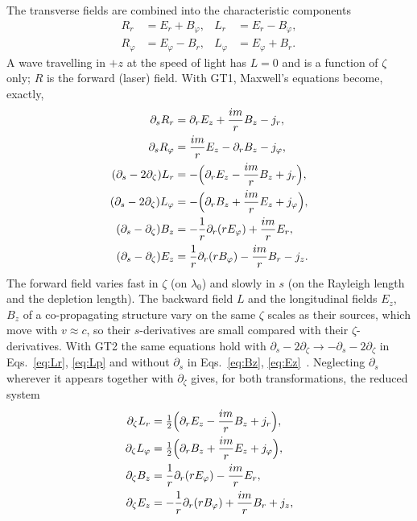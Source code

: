 \documentclass[aps,prab,reprint,floatfix,superscriptaddress,amsmath,amssymb]{revtex4-2}
\begin{document}
The transverse fields are combined into the characteristic components
\begin{align}
R_r &= E_r + B_\varphi, & L_r &= E_r - B_\varphi, \nonumber\\
R_\varphi &= E_\varphi - B_r, & L_\varphi &= E_\varphi + B_r .
\end{align}
A wave travelling in $+z$ at the speed of light has $L = 0$ and is a function of $\zeta$ only; $R$ is the forward (laser) field. With GT1, Maxwell's equations become, exactly,
\begin{align}
\partial_s R_r &= \partial_r E_z + \frac{im}{r} B_z - j_r, \label{eq:Rr}\\
\partial_s R_\varphi &= \frac{im}{r} E_z - \partial_r B_z - j_\varphi, \label{eq:Rp}\\
(\partial_s - 2\partial_\zeta) L_r &= -\Bigl(\partial_r E_z - \frac{im}{r}B_z + j_r\Bigr), \label{eq:Lr}\\
(\partial_s - 2\partial_\zeta) L_\varphi &= -\Bigl(\partial_r B_z + \frac{im}{r}E_z + j_\varphi\Bigr), \label{eq:Lp}\\
(\partial_s - \partial_\zeta) B_z &= -\frac{1}{r}\partial_r (r E_\varphi) + \frac{im}{r} E_r, \label{eq:Bz}\\
(\partial_s - \partial_\zeta) E_z &= \frac{1}{r}\partial_r (r B_\varphi) - \frac{im}{r} B_r - j_z . \label{eq:Ez}
\end{align}
The forward field varies fast in $\zeta$ (on $\lambda_0$) and slowly in $s$ (on the Rayleigh length and the depletion length). The backward field $L$ and the longitudinal fields $E_z$, $B_z$ of a co-propagating structure vary on the same $\zeta$ scales as their sources, which move with $v \approx c$, so their $s$-derivatives are small compared with their $\zeta$-derivatives. With GT2 the same equations hold with $\partial_s - 2\partial_\zeta \to -\partial_s - 2\partial_\zeta$ in Eqs.~\eqref{eq:Lr}, \eqref{eq:Lp} and without $\partial_s$ in Eqs.~\eqref{eq:Bz}, \eqref{eq:Ez}~\cite{GEMPIC}. Neglecting $\partial_s$ wherever it appears together with $\partial_\zeta$ gives, for both transformations, the reduced system
\begin{align}
\partial_\zeta L_r &= \tfrac12\Bigl(\partial_r E_z - \frac{im}{r}B_z + j_r\Bigr), \label{eq:Lr2}\\
\partial_\zeta L_\varphi &= \tfrac12\Bigl(\partial_r B_z + \frac{im}{r}E_z + j_\varphi\Bigr), \label{eq:Lp2}\\
\partial_\zeta B_z &= \frac{1}{r}\partial_r (r E_\varphi) - \frac{im}{r} E_r, \label{eq:Bz2}\\
\partial_\zeta E_z &= -\frac{1}{r}\partial_r (r B_\varphi) + \frac{im}{r} B_r + j_z , \label{eq:Ez2}
\end{align}
\end{document}
